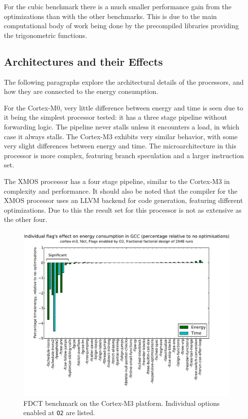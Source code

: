 \documentclass[twocolumn]{article}
\let\oldcaption\caption
\renewcommand{\caption}[1]{\oldcaption{\textup{#1}}}
\begin{document}
For the cubic benchmark there is a much smaller performance gain from the optimizations than with the other benchmarks. This is due to the main computational body of work being done by the precompiled libraries providing the trigonometric functions.

\subsection{Architectures and their Effects}

The following paragraphs explore the architectural details of the processors, and how they are connected to the energy consumption.

For the Cortex-M0, very little difference between energy and time is seen due to it being the simplest processor tested: it has a three stage pipeline without forwarding logic. The pipeline never stalls unless it encounters a load, in which case it always stalls. The Cortex-M3 exhibits very similar behavior, with some very slight differences between energy and time. The microarchitecture in this processor is more complex, featuring branch speculation and a larger instruction set\cite{Yiu2010}.

The XMOS processor has a four stage pipeline, similar to the Cortex-M3 in complexity and performance. It should also be noted that the compiler for the XMOS processor uses an LLVM backend for code generation, featuring different optimizations. Due to this the result set for this processor is not as extensive as the other four.

\begin{figure}[bt!]
	\includegraphics[width=\linewidth,clip,trim=0.5cm 0 2cm 1.8cm]{cortex-m3/O2_main_effects_fdct.pdf}
	\caption{FDCT benchmark on the Cortex-M3 platform. Individual options enabled at \texttt{O2} are listed.}
	\label{Fig:FdctO2MainEffects}
\end{figure}
\end{document}
